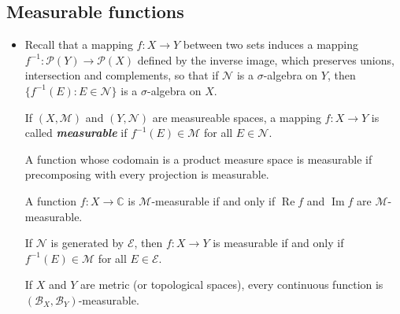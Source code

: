 \documentclass{article}
\theoremstyle{definition}
\numberwithin{equation}{section}
\newcommand{\C}{\mathbb{C}}
\begin{document}
	\subsection{Measurable functions}
	\begin{itemize}
			\item Recall that a mapping $f:X\to Y$ between two sets induces a mapping $f^{-1}:\mathcal{P}(Y)\to\mathcal{P}(X)$ defined by the inverse image, which preserves unions, intersection and complements, so that if $\mathcal{N}$ is a $\sigma$-algebra on $Y$, then $\{f^{-1}(E):E\in\mathcal{N}\}$ is a $\sigma$-algebra on $X$.
			
			If $(X,\mathcal{M})$ and $(Y,\mathcal{N})$ are measureable spaces, a mapping $f:X\to Y$ is called \textbf{\textit{measurable}} if $f^{-1}(E)\in\mathcal{M}$ for all $E\in\mathcal{N}$.
			
			\begin{prop}
				A function whose codomain is a product measure space is measurable if precomposing with every projection is measurable.
			\end{prop}
			\begin{coro}
				A function $f:X\to\C$ is $\mathcal{M}$-measurable if and only if $\operatorname{Re} f$ and $\operatorname{Im} f$ are $\mathcal{M}$-measurable.
			\end{coro}
			
			\begin{prop}
				If $\mathcal{N}$ is generated by $\mathcal{E}$, then $f:X\to Y$ is measurable if and only if $f^{-1}(E)\in\mathcal{M}$ for all $E\in\mathcal{E}$.
			\end{prop}
			\begin{coro}
				If $X$ and $Y$ are metric (or topological spaces), every continuous function is $(\mathcal{B}_X,\mathcal{B}_Y)$-measurable.
			\end{coro}
			

\end{itemize}
\end{document}
